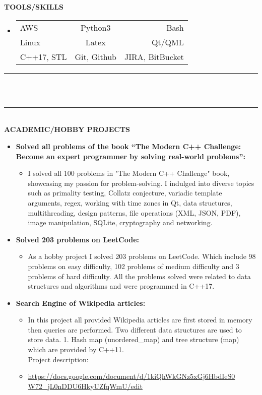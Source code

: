 \documentclass[9pt,a4paper]{article}
\newcommand{\MyHorizontalLine}{\noindent\rule{\linewidth}{1.5pt}\\}
\begin{document}
	\textbf{TOOLS/SKILLS}
	\begin{itemize}
		\item[]
		\begin{tabular}{ l c r }
			AWS & Python3 & Bash \\
			Linux & Latex & Qt/QML \\
			C++17, STL & Git, Github & JIRA, BitBucket
		\end{tabular}
	\end{itemize}
	\MyHorizontalLine
	\pagebreak
	\\
	\MyHorizontalLine
	\textbf{ACADEMIC/HOBBY PROJECTS}
	\begin{itemize}
		\item \textbf{Solved all problems of the book “The Modern C++ Challenge: Become an expert programmer by solving real-world problems”:}
		\begin{itemize}
			\item[] I solved all 100 problems in "The Modern C++ Challenge" book, showcasing my passion for problem-solving. I indulged into diverse topics such as primality testing, Collatz conjecture, variadic template arguments, regex, working with time zones in Qt, data structures, multithreading, design patterns, file operations (XML, JSON, PDF), image manipulation, SQLite, cryptography and networking.
		\end{itemize}
		
			
		\item \textbf{Solved 203 problems on LeetCode:}
			\begin{itemize}
			\item[]As a hobby project I solved 203 problems on LeetCode. Which include 98 problems on easy difficulty, 102 problems of medium difficulty and 3 problems of hard difficulty. All the problems solved were related to data structures and algorithms and
			were programmed in C++17.
			\end{itemize}
		
		\item \textbf{Search Engine of Wikipedia articles:}
		\begin{itemize}
			\item[]In this project all provided Wikipedia articles are first stored in memory then queries are performed. Two different data structures are used to store data. 1. Hash map (unordered\_map) and tree structure (map) which are provided by C++11.\\
			Project description:
			\item[]\raggedright\href{https://docs.google.com/document/d/1kiQhWkGNz5xGj6HbdIeS0 W72_jL0nDDU6HkyUZfqWmU/edit}{https://docs.google.com/document/d/1kiQhWkGNz5xGj6HbdIeS0 W72\_jL0nDDU6HkyUZfqWmU/edit}
		\end{itemize}
		

\end{itemize}
\end{document}

